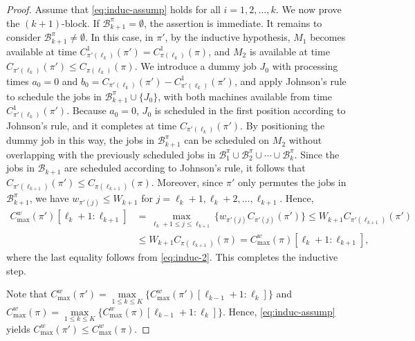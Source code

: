 \documentclass[12pt]{article} \textheight=24.5cm \textwidth=16.5cm \parskip = 0.165cm
\begin{document}
\begin{sloppypar}
\begin{proof}
            Assume that \cref{eq:induc-assump} holds for all $i=1, 2, \ldots, k$.
            We now prove the $(k+1)$-block.
            If $\mathcal{B}_{k+1}^{\pi}=\emptyset$, the assertion is immediate.
            It remains to consider $\mathcal{B}_{k+1}^{\pi} \neq \emptyset$.
            In this case, in $\pi'$, by the inductive hypothesis, $M_1$ becomes available at time $C_{\pi'(\ell_k)}^1(\pi')=C_{\pi(\ell_k)}^1(\pi)$, and $M_2$ is available at time $C_{\pi'(\ell_k)}(\pi') \leq C_{\pi(\ell_k)}(\pi)$.
            We introduce a dummy job $J_0$ with processing times $a_0=0$ and $b_0=C_{\pi'(\ell_k)}(\pi')-C_{\pi'(\ell_k)}^1(\pi')$, and apply Johnson's rule to schedule the jobs in $\mathcal{B}_{k+1}^{\pi} \cup \{J_0\}$, with both machines available from time $C_{\pi'(\ell_k)}^1(\pi')$.
            Because $a_0=0$, $J_0$ is scheduled in the first position according to Johnson's rule, and it completes at time $C_{\pi'(\ell_k)}(\pi')$.
            By positioning the dummy job in this way, the jobs in $\mathcal{B}_{k+1}^{\pi}$ can be scheduled on $M_2$ without overlapping with the previously scheduled jobs in $\mathcal{B}_1^{\pi} \cup \mathcal{B}_2^{\pi} \cup \cdots \cup \mathcal{B}_k^{\pi}$.
            Since the jobs in $\mathcal{B}_{k+1}$ are scheduled according to Johnson's rule, it follows that $C_{\pi'(\ell_{k+1})} (\pi') \leq C_{\pi(\ell_{k+1})}(\pi)$.
            Moreover, since $\pi'$ only permutes the jobs in $\mathcal{B}_{k+1}^{\pi}$, we have $w_{\pi'(j)} \leq W_{k+1}$ for $j=\ell_k+1, \ell_k+2, \ldots, \ell_{k+1}$.
            Hence,
            \begin{align*}
                C_{\max}^w(\pi')[\ell_k+1:\ell_{k+1}] & = \max_{\ell_k+1 \leq j \leq \ell_{k+1}}\{w_{\pi'(j)}C_{\pi'(j)}(\pi')\} \leq W_{k+1} C_{\pi'(\ell_{k+1})}(\pi') \\
                & \leq W_{k+1} C_{\pi(\ell_{k+1})}(\pi)=C_{\max}^w(\pi)[\ell_k+1:\ell_{k+1}],
            \end{align*}
            where the last equality follows from \cref{eq:induc-2}.
            This completes the inductive step.
            
            Note that $C_{\max}^w(\pi')=\max\limits_{1 \leq k \leq K} \{C_{\max}^w(\pi')[\ell_{k-1}+1:\ell_k]\}$ and $C_{\max}^w(\pi)=\max\limits_{1 \leq k \leq K} \{C_{\max}^w(\pi)[\ell_{k-1}+1:\ell_k]\}$.
            Hence, \cref{eq:induc-assump} yields $C_{\max}^w(\pi') \leq C_{\max}^w(\pi)$.
        \end{proof}
        

\end{sloppypar}
\end{document}
